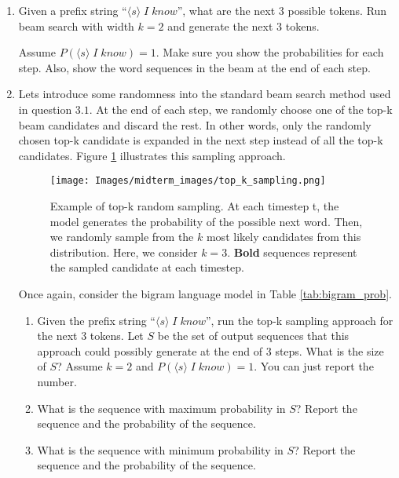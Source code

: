 \documentclass[12pt, letterpaper]{article}
\begin{document}
\begin{enumerate}
    \item Given a prefix string ``$\langle s\rangle\;I\;know$'', what are the next $3$ possible tokens. Run beam search with width $k=2$ and generate the next $3$ tokens. 
    
    Assume $P(\langle s  \rangle\;I\;know) = 1$. Make sure you show the probabilities for each step. Also, show the word sequences in the beam at the end of each step.
    
    \item Lets introduce some randomness into the standard beam search method used in question $3.1$. At the end of each step, we randomly choose one of the top-k beam candidates and discard the rest. In other words, only the randomly chosen top-k candidate is expanded in the next step instead of all the top-k candidates. Figure \ref{fig:top_k} illustrates this sampling approach.
    
    \begin{figure}[h!]
    \centering
    \texttt{[image: Images/midterm\_images/top\_k\_sampling.png]}
    \caption{Example of top-k random sampling. At each timestep t, the model generates the probability of the possible next word. Then, we randomly sample from the $k$ most likely candidates from this distribution. Here, we consider $k = 3$. \textbf{Bold} sequences represent the sampled candidate at each timestep.}
    \label{fig:top_k}
\end{figure}
    
    Once again, consider the bigram language model in Table \ref{tab:bigram_prob}.
    
    \begin{enumerate}
        \item Given the prefix string ``$\langle s\rangle\;I\;know$'', run the top-k sampling approach for the next 3 tokens.  Let $S$ be the set of output sequences that this approach could possibly generate at the end of 3 steps. What is the size of $S$? Assume $k = 2$ and $P(\langle s  \rangle\;I\;know) = 1$. You can just report the number.
        
        \item What is the sequence with maximum probability in $S$? Report the sequence and the probability of the sequence. 
        
        \item What is the sequence with  minimum probability in $S$? Report the sequence and the probability of the sequence.
        
    \end{enumerate}

\end{enumerate}
\end{document}
